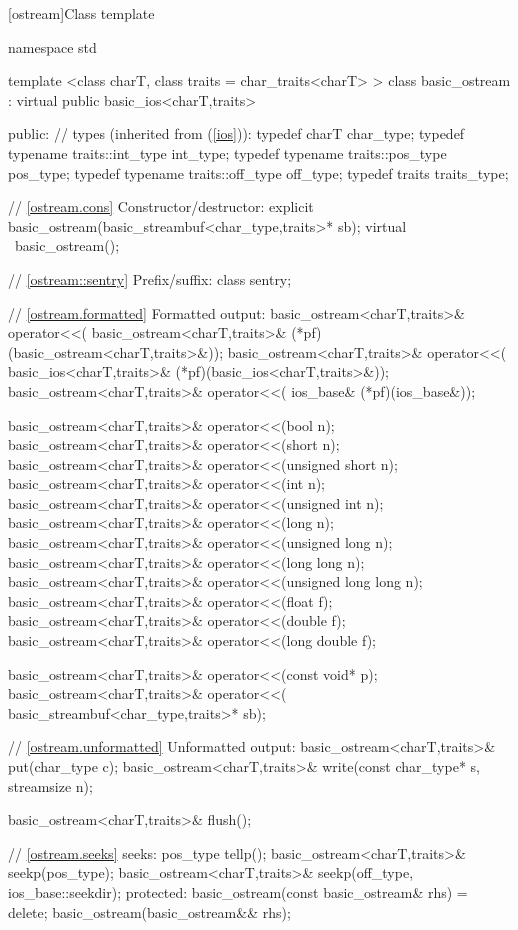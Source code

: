 [ostream]{Class template }
\begin{codeblock}
namespace std {
  template <class charT, class traits = char_traits<charT> >
  class basic_ostream : virtual public basic_ios<charT,traits> {
  public:
    // types (inherited from  (\ref{ios})):
    typedef charT                     char_type;
    typedef typename traits::int_type int_type;
    typedef typename traits::pos_type pos_type;
    typedef typename traits::off_type off_type;
    typedef traits                    traits_type;

    // \ref{ostream.cons} Constructor/destructor:
    explicit basic_ostream(basic_streambuf<char_type,traits>* sb);
    virtual ~basic_ostream();

    // \ref{ostream::sentry} Prefix/suffix:
    class sentry;

    // \ref{ostream.formatted} Formatted output:
    basic_ostream<charT,traits>& operator<<(
      basic_ostream<charT,traits>& (*pf)(basic_ostream<charT,traits>&));
    basic_ostream<charT,traits>& operator<<(
      basic_ios<charT,traits>& (*pf)(basic_ios<charT,traits>&));
    basic_ostream<charT,traits>& operator<<(
      ios_base& (*pf)(ios_base&));

    basic_ostream<charT,traits>& operator<<(bool n);
    basic_ostream<charT,traits>& operator<<(short n);
    basic_ostream<charT,traits>& operator<<(unsigned short n);
    basic_ostream<charT,traits>& operator<<(int n);
    basic_ostream<charT,traits>& operator<<(unsigned int n);
    basic_ostream<charT,traits>& operator<<(long n);
    basic_ostream<charT,traits>& operator<<(unsigned long n);
    basic_ostream<charT,traits>& operator<<(long long n);
    basic_ostream<charT,traits>& operator<<(unsigned long long n);
    basic_ostream<charT,traits>& operator<<(float f);
    basic_ostream<charT,traits>& operator<<(double f);
    basic_ostream<charT,traits>& operator<<(long double f);

    basic_ostream<charT,traits>& operator<<(const void* p);
    basic_ostream<charT,traits>& operator<<(
      basic_streambuf<char_type,traits>* sb);

    // \ref{ostream.unformatted} Unformatted output:
    basic_ostream<charT,traits>& put(char_type c);
    basic_ostream<charT,traits>& write(const char_type* s, streamsize n);

    basic_ostream<charT,traits>& flush();

    // \ref{ostream.seeks} seeks:
    pos_type tellp();
    basic_ostream<charT,traits>& seekp(pos_type);
    basic_ostream<charT,traits>& seekp(off_type, ios_base::seekdir);
  protected:
    basic_ostream(const basic_ostream& rhs) = delete;
    basic_ostream(basic_ostream&& rhs);

}}
\end{codeblock}
